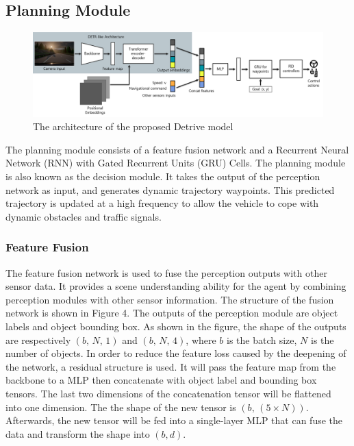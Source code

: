 \documentclass[conference]{IEEEtran}
\begin{document}
\subsection{Planning Module}

\begin{figure}[ht]
    \centering
    \includegraphics[width=\textwidth]{3.png}
    \caption{ The architecture of the proposed Detrive model}
    \label{fig:3}
\end{figure}

The planning module consists of a feature fusion network and a Recurrent Neural Network (RNN) with Gated Recurrent Units (GRU) Cells. The planning module is also known as the decision module. It takes the output of the perception network as input, and generates dynamic trajectory waypoints. This predicted trajectory is updated at a high frequency to allow the vehicle to cope with dynamic obstacles and traffic signals.

\subsubsection{Feature Fusion}
The feature fusion network is used to fuse the perception outputs with other sensor data. It provides a scene understanding ability for the agent by combining perception modules with other sensor information. The structure of the fusion network is shown in Figure 4. The outputs of the perception module are object labels and object bounding box. As shown in the figure, the shape of the outputs are respectively \((b,\,N,\,1)\) and \((b,\,N,\,4)\), where \(b\) is the batch size, \(N\) is the number of objects. In order to reduce the feature loss caused by the deepening of the network, a residual structure is used. It will pass the feature map from the backbone to a MLP then concatenate with object label and bounding box tensors. The last two dimensions of the concatenation tensor will be flattened into one dimension. The the shape of the new tensor is \((b,\,(5\times N))\). Afterwards, the new tensor will be fed into a single-layer MLP that can fuse the data and transform the shape into \((b,d)\).
\end{document}
